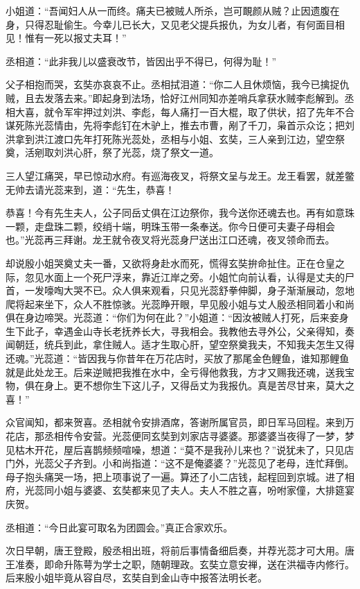 \documentclass[12pt]{lsbook}
\begin{document}
小姐道：“吾闻妇人从一而终。痛夫已被贼人所杀，岂可靦颜从贼？止因遗腹在身，只得忍耻偷生。今幸儿已长大，又见老父提兵报仇，为女儿者，有何面目相见！惟有一死以报丈夫耳！”

丞相道：“此非我儿以盛衰改节，皆因出乎不得已，何得为耻！”

父子相抱而哭，玄奘亦哀哀不止。丞相拭泪道：“你二人且休烦恼，我今已擒捉仇贼，且去发落去来。”即起身到法场，恰好江州同知亦差哨兵拿获水贼李彪解到。丞相大喜，就令军牢押过刘洪、李彪，每人痛打一百大棍，取了供状，招了先年不合谋死陈光蕊情由，先将李彪钉在木驴上，推去市曹，剐了千刀，枭首示众讫；把刘洪拿到洪江渡口先年打死陈光蕊处，丞相与小姐、玄奘，三人亲到江边，望空祭奠，活剜取刘洪心肝，祭了光蕊，烧了祭文一道。

三人望江痛哭，早已惊动水府。有巡海夜叉，将祭文呈与龙王。龙王看罢，就差鳖无帅去请光蕊来到，道：“先生，恭喜！

恭喜！今有先生夫人，公子同岳丈俱在江边祭你，我今送你还魂去也。再有如意珠一颗，走盘珠二颗，绞绡十端，明珠玉带一条奉送。你今日便可夫妻子母相会也。”光蕊再三拜谢。龙王就令夜叉将光蕊身尸送出江口还魂，夜叉领命而去。

却说殷小姐哭奠丈夫一番，又欲将身赴水而死，慌得玄奘拚命扯住。正在仓皇之际，忽见水面上一个死尸浮来，靠近江岸之旁。小姐忙向前认看，认得是丈夫的尸首，一发嚎啕大哭不已。众人俱来观看，只见光蕊舒拳伸脚，身子渐渐展动，忽地爬将起来坐下，众人不胜惊骇。光蕊睁开眼，早见殷小姐与丈人殷丞相同着小和尚俱在身边啼哭。光蕊道：“你们为何在此？”小姐道：“因汝被贼人打死，后来妾身生下此子，幸遇金山寺长老抚养长大，寻我相会。我教他去寻外公，父亲得知，奏闻朝廷，统兵到此，拿住贼人。适才生取心肝，望空祭奠我夫，不知我夫怎生又得还魂。”光蕊道：“皆因我与你昔年在万花店时，买放了那尾金色鲤鱼，谁知那鲤鱼就是此处龙王。后来逆贼把我推在水中，全亏得他救我，方才又赐我还魂，送我宝物，俱在身上。更不想你生下这儿子，又得岳丈为我报仇。真是苦尽甘来，莫大之喜！”

众官闻知，都来贺喜。丞相就令安排酒席，答谢所属官员，即日军马回程。来到万花店，那丞相传令安营。光蕊便同玄奘到刘家店寻婆婆。那婆婆当夜得了一梦，梦见枯木开花，屋后喜鹊频频喧噪，想道：“莫不是我孙儿来也？”说犹未了，只见店门外，光蕊父子齐到。小和尚指道：“这不是俺婆婆？”光蕊见了老母，连忙拜倒。母子抱头痛哭一场，把上项事说了一遍。算还了小二店钱，起程回到京城。进了相府，光蕊同小姐与婆婆、玄奘都来见了夫人。夫人不胜之喜，吩咐家僮，大排筵宴庆贺。

丞相道：“今日此宴可取名为团圆会。”真正合家欢乐。

次日早朝，唐王登殿，殷丞相出班，将前后事情备细启奏，并荐光蕊才可大用。唐王准奏，即命升陈萼为学士之职，随朝理政。玄奘立意安禅，送在洪福寺内修行。后来殷小姐毕竟从容自尽，玄奘自到金山寺中报答法明长老。
\end{document}
